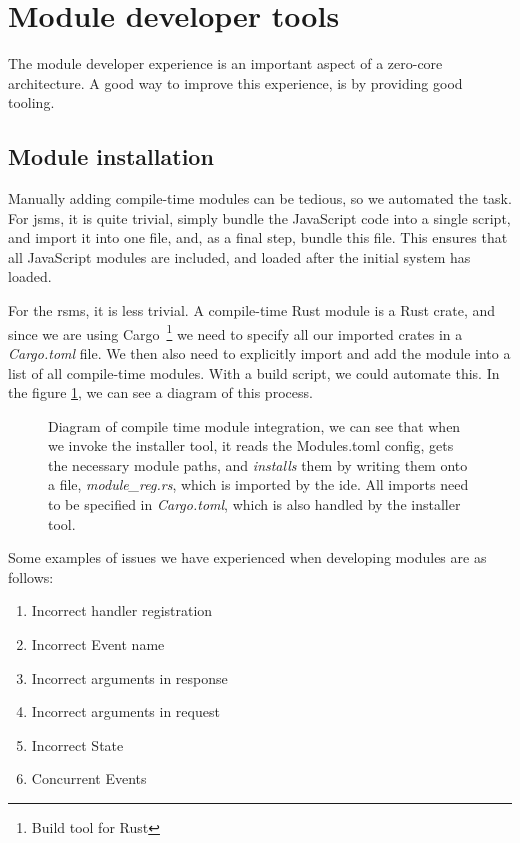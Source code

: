 \section{Module developer tools} \label{sec:mdt}

The module developer experience is an important aspect of a zero-core
architecture. A good way to improve this experience, is by providing good
tooling.

\subsection{Module installation}

Manually adding compile-time modules can be tedious, so we automated the task.
For \gls{jsms}, it is quite trivial, simply bundle the JavaScript code into a
single script, and import it into one file, and, as a final step, bundle this
file. This ensures that all JavaScript modules are included, and loaded after
the initial system has loaded. 

For the \gls{rsms}, it is less trivial. A compile-time Rust module is a Rust
crate, and since we are using Cargo~\footnote{Build tool for Rust} we need to
specify all our imported crates in a \textit{Cargo.toml} file. We then also
need to explicitly import and add the module into a list of all compile-time
modules. With a build script, we could automate this. In the figure
\ref{fig:compMod}, we can see a diagram of this process. 

\begin{figure}
  \centering
  
  \caption{
    Diagram of compile time module integration, we can see that when we invoke
    the installer tool, it reads the Modules.toml config, gets the necessary
    module paths, and \textit{installs} them by writing them onto a file,
    \textit{module\_reg.rs}, which is imported by the \gls*{ide}. All imports
    need to be specified in \textit{Cargo.toml}, which is also handled by the
    installer tool.
  }
  \label{fig:compMod}
\end{figure}

Some examples of issues we have experienced when developing modules are as
follows:

\begin{enumerate}
  \item Incorrect handler registration
  \item Incorrect Event name
  \item Incorrect arguments in response
  \item Incorrect arguments in request
  \item Incorrect State
  \item Concurrent Events
\end{enumerate}

